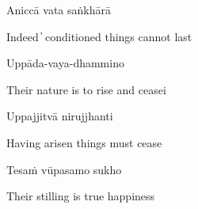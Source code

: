 
Aniccā vata saṅkhārā

\begin{english}
  Indeed  ̓  conditioned things cannot last
\end{english}

Uppāda-vaya-dhammino

\begin{english}
  Their nature is to rise and ceasei
\end{english}

Uppajjitvā nirujjhanti

\begin{english}
  Having arisen things must cease
\end{english}

Tesaṁ vūpasamo sukho

\begin{english}
  Their stilling is true happiness
\end{english}


\clearpage

